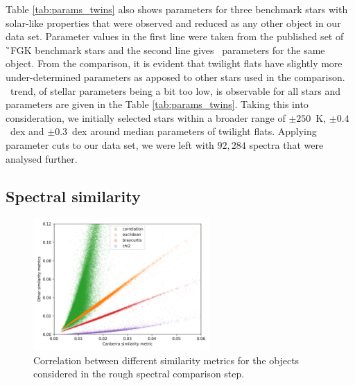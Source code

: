 Table \ref{tab:params_twins} also shows parameters for three benchmark stars with solar-like properties that were observed and reduced as any other object in our data set. Parameter values in the first line were taken from the published set of \G\ FGK benchmark stars \cite{2014A&A...564A.133J, 2015A&A...582A..49H} and the second line gives \TC\ parameters for the same object. From the comparison, it is evident that twilight flats have slightly more under-determined parameters as apposed to other stars used in the comparison. \TC\ trend, of stellar parameters being a bit too low, is observable for all stars and parameters are given in the Table \ref{tab:params_twins}. Taking this into consideration, we initially selected stars within a broader range of \Teff$ \pm 250 $~K, \Logg$ \pm 0.4 $~dex and \Feh$ \pm 0.3 $~dex around median parameters of twilight flats. Applying parameter cuts to our data set, we were left with $92,284$ spectra that were analysed further.

\subsection{Spectral similarity}
\label{sec:spec_comp_twins}

\begin{figure}
	\centering
	\includegraphics[width=0.6\textwidth]{sim_combine_b2.png}
	\caption{Correlation between different similarity metrics for the objects considered in the rough spectral comparison step.}
	\label{fig:sim_combine_twins}
\end{figure}

